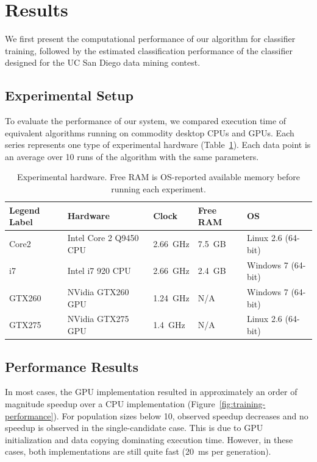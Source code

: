 \documentclass[11pt]{article}       %
\begin{document}
\section{Results} \label{results}
We first present the computational performance of our algorithm for classifier training, followed by the estimated classification performance of the classifier designed for the UC San Diego data mining contest.

\subsection{Experimental Setup} \label{experiment}
To evaluate the performance of our system, we compared execution time of equivalent algorithms running on commodity desktop CPUs and GPUs. Each series represents one type of experimental hardware (Table~\ref{tab:experimental-hardware}). Each data point is an average over 10 runs of the algorithm with the same parameters.

\begin{table}[h]
	\centering
	\begin{tabular}{lllll}
	\textbf{Legend Label} & \textbf{Hardware} & \textbf{Clock} & \textbf{Free RAM} & \textbf{OS} \\
	\hline
	Core2  & Intel Core 2 Q9450 CPU & 2.66~GHz & 7.5~GB & Linux 2.6 (64-bit) \\
	i7     & Intel i7 920 CPU       & 2.66~GHz & 2.4~GB & Windows 7 (64-bit) \\
	GTX260 & NVidia GTX260 GPU      & 1.24~GHz & N/A    & Windows 7 (64-bit) \\
	GTX275 & NVidia GTX275 GPU      & 1.4~GHz  & N/A    & Linux 2.6 (64-bit) \\
	\hline
	\end{tabular}
	\caption{Experimental hardware. Free RAM is OS-reported available memory before running each experiment.}
	\label{tab:experimental-hardware}
\end{table}

\subsection{Performance Results} \label{performance}
In most cases, the GPU implementation resulted in approximately an order of magnitude speedup over a CPU implementation (Figure~\ref{fig:training-performance}). For population sizes below 10, observed speedup decreases and no speedup is observed in the single-candidate case. This is due to GPU initialization and data copying dominating execution time. However, in these cases, both implementations are still quite fast (20~ms per generation).
\end{document}
